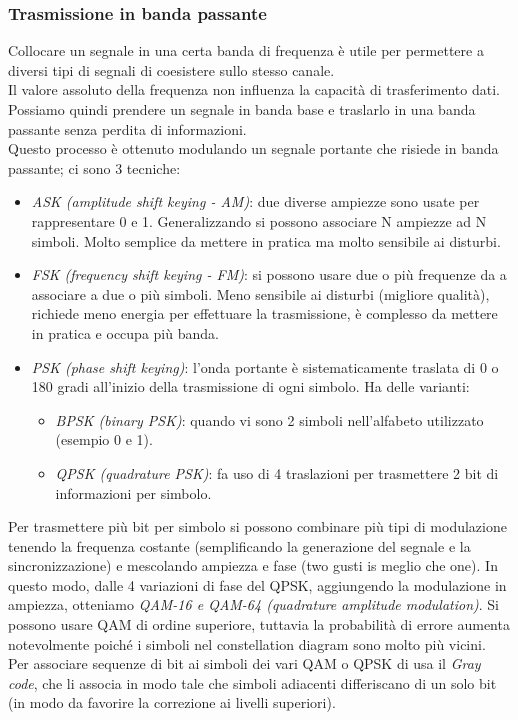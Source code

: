 \documentclass[10pt,a4paper,twoside]{article}
\begin{document}
\subsubsection{Trasmissione in banda passante}
Collocare un segnale in una certa banda di frequenza è utile per permettere a diversi tipi di segnali di coesistere sullo stesso canale.\\
Il valore assoluto della frequenza non influenza la capacità di trasferimento dati. Possiamo quindi prendere un segnale in banda base e traslarlo in una banda passante senza perdita di informazioni.\\
Questo processo è ottenuto modulando un segnale portante che risiede in banda passante; ci sono 3 tecniche:
\begin{itemize}
\item \textit{ASK (amplitude shift keying - AM)}: due diverse ampiezze sono usate per rappresentare 0 e 1. Generalizzando si possono associare N ampiezze ad N simboli. Molto semplice da mettere in pratica ma molto sensibile ai disturbi.
\item \textit{FSK (frequency shift keying - FM)}: si possono usare due o più frequenze da a associare a due o più simboli. Meno sensibile ai disturbi (migliore qualità), richiede meno energia per effettuare la trasmissione, è complesso da mettere in pratica e occupa più banda.
\item \textit{PSK (phase shift keying)}: l'onda portante è sistematicamente traslata di 0 o 180 gradi all'inizio della trasmissione di ogni simbolo. Ha delle varianti:
	\begin{itemize}
	\item \textit{BPSK (binary PSK)}: quando vi sono 2 simboli nell'alfabeto utilizzato (esempio 0 e 1).
	\item \textit{QPSK (quadrature PSK)}: fa uso di 4 traslazioni per trasmettere 2 bit di informazioni per simbolo.
	\end{itemize}
\end{itemize}
Per trasmettere più bit per simbolo si possono combinare più tipi di modulazione tenendo la frequenza costante (semplificando la generazione del segnale e la sincronizzazione) e mescolando ampiezza e fase (two gusti is meglio che one). In questo modo, dalle 4 variazioni di fase del QPSK, aggiungendo la modulazione in ampiezza, otteniamo \textit{QAM-16 e QAM-64 (quadrature amplitude modulation)}. Si possono usare QAM di ordine superiore, tuttavia la probabilità di errore aumenta notevolmente poiché i simboli nel constellation diagram sono molto più vicini.\\
Per associare sequenze di bit ai simboli dei vari QAM o QPSK di usa il \textit{Gray code}, che li associa in modo tale che simboli adiacenti differiscano di un solo bit (in modo da favorire la correzione ai livelli superiori).
\end{document}
